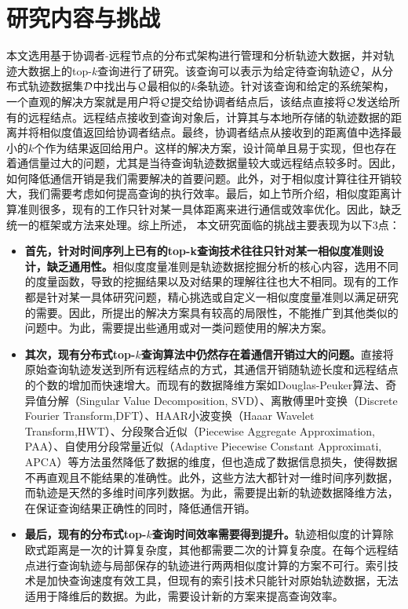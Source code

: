 \section{研究内容与挑战}\label{sec-c1-content}
本文选用基于协调者-远程节点的分布式架构进行管理和分析轨迹大数据，并对轨迹大数据上的top-$k$查询进行了研究。该查询可以表示为给定待查询轨迹$\cal Q$，从分布式轨迹数据集$\cal D$中找出与$\cal Q$最相似的$k$条轨迹。针对该查询和给定的系统架构，一个直观的解决方案就是用户将$\cal Q$提交给协调者结点后，该结点直接将$\cal Q$发送给所有的远程结点。远程结点接收到查询对象后，计算其与本地所存储的轨迹数据的距离并将相似度值返回给协调者结点。最终，协调者结点从接收到的距离值中选择最小的$k$个作为结果返回给用户。这样的解决方案，设计简单且易于实现，但也存在着通信量过大的问题，尤其是当待查询轨迹数据量较大或远程结点较多时。因此，如何降低通信开销是我们需要解决的首要问题。此外，对于相似度计算往往开销较大，我们需要考虑如何提高查询的执行效率。最后，如上节所介绍，相似度距离计算准则很多，现有的工作只针对某一具体距离来进行通信或效率优化。因此，缺乏统一的框架或方法来处理。综上所述，
本文研究面临的挑战主要表现为以下3点：
\begin{itemize}
	\item  \textbf{首先，针对时间序列上已有的top-k查询技术往往只针对某一相似度准则设计，缺乏通用性。}相似度度量准则是轨迹数据挖掘分析的核心内容，选用不同的度量函数，导致的挖掘结果以及对结果的理解往往也大不相同。现有的工作都是针对某一具体研究问题，精心挑选或自定义一相似度度量准则以满足研究的需要。因此，所提出的解决方案具有较高的局限性，不能推广到其他类似的问题中。为此，需要提出些通用或对一类问题使用的解决方案。
	
	\item \textbf{其次，现有分布式top-$k$查询算法中仍然存在着通信开销过大的问题。}直接将原始查询轨迹发送到所有远程结点的方式，其通信开销随轨迹长度和远程结点的个数的增加而快速增大。而现有的数据降维方案如Douglas-Peuker算法、奇异值分解（Singular Value Decomposition, SVD）、离散傅里叶变换（Discrete Fourier Transform,DFT）、HAAR小波变换（Haaar Wavelet Transform,HWT）、分段聚合近似（Piecewise Aggregate Approximation, PAA）、自使用分段常量近似（Adaptive Piecewise Constant Approximati, APCA）等方法虽然降低了数据的维度，但也造成了数据信息损失，使得数据不再直观且不能结果的准确性。此外，这些方法大都针对一维时间序列数据，而轨迹是天然的多维时间序列数据。为此，需要提出新的轨迹数据降维方法，在保证查询结果正确性的同时，降低通信开销。

	\item \textbf{最后，现有的分布式top-$k$查询时间效率需要得到提升。}轨迹相似度的计算除欧式距离是一次的计算复杂度，其他都需要二次的计算复杂度。在每个远程结点进行查询轨迹与局部保存的轨迹进行两两相似度计算的方案不可行。索引技术是加快查询速度有效工具，但现有的索引技术只能针对原始轨迹数据，无法适用于降维后的数据。为此，需要设计新的方案来提高查询效率。
	
\end{itemize}

